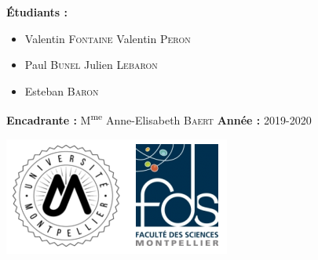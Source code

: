 \documentclass[twoside]{report}
\begin{document}
\begin{titlepage}

\vspace{1.7cm}
\large{\textbf{Étudiants :}}
\begin{itemize}[label=]
    \setlength\itemsep{0em}
    \item \large{Valentin \textsc{Fontaine}}
    \hfill \large{Valentin \textsc{Peron}}
    \item \large{Paul \textsc{Bunel}} 
    \hfill \large{Julien \textsc{Lebaron}}
    \item \large{Esteban \textsc{Baron}}
\end{itemize}

\vspace{0.5cm}
\large{\textbf{Encadrante :}}
\large{M\textsuperscript{me} Anne-Elisabeth \textsc{Baert}}
\hfill
\large{\textbf{Année :} 2019-2020}


\vspace{0.8cm}
\begin{center}
\includegraphics[scale=0.6]{logoFDS.png}
\end{center}


\end{titlepage}

\setcounter{page}{1}
\setcounter{tocdepth}{1}
\tableofcontents

\renewcommand{\chaptername}{Partie}
\end{document}
